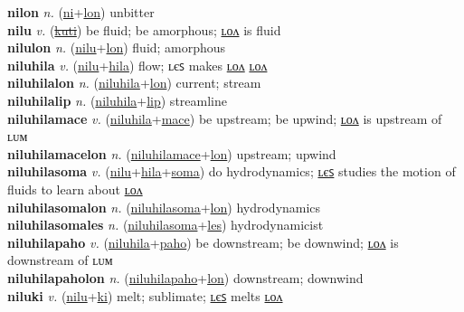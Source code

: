 \textbf{nilon} \textit{n.} (\hyperref[ni]{ni}+\hyperref[lon]{lon})
unbitter \label{nilon} \\
\textbf{nilu} \textit{v.} (\hyperref[kuti]{\sout{kuti}})
be fluid; be amorphous; \hyperref[nilulon]{ʟᴏᴧ} is fluid \label{nilu} \\
\textbf{nilulon} \textit{n.} (\hyperref[nilu]{nilu}+\hyperref[lon]{lon})
fluid; amorphous \label{nilulon} \\
\textbf{niluhila} \textit{v.} (\hyperref[nilu]{nilu}+\hyperref[hila]{hila})
flow; ʟєꜱ makes \hyperref[niluhilalon]{ʟᴏᴧ} \hyperref[niluhilalon]{ʟᴏᴧ} \label{niluhila} \\
\textbf{niluhilalon} \textit{n.} (\hyperref[niluhila]{niluhila}+\hyperref[lon]{lon})
current; stream \label{niluhilalon} \\
\textbf{niluhilalip} \textit{n.} (\hyperref[niluhila]{niluhila}+\hyperref[lip]{lip})
streamline \label{niluhilalip} \\
\textbf{niluhilamace} \textit{v.} (\hyperref[niluhila]{niluhila}+\hyperref[mace]{mace})
be upstream; be upwind; \hyperref[niluhilamacelon]{ʟᴏᴧ} is upstream of ʟᴜᴍ \label{niluhilamace} \\
\textbf{niluhilamacelon} \textit{n.} (\hyperref[niluhilamace]{niluhilamace}+\hyperref[lon]{lon})
upstream; upwind \label{niluhilamacelon} \\
\textbf{niluhilasoma} \textit{v.} (\hyperref[nilu]{nilu}+\hyperref[hila]{hila}+\hyperref[soma]{soma})
do hydrodynamics; \hyperref[niluhilasomales]{ʟєꜱ} studies the motion of fluids to learn about \hyperref[niluhilasomalon]{ʟᴏᴧ} \label{niluhilasoma} \\
\textbf{niluhilasomalon} \textit{n.} (\hyperref[niluhilasoma]{niluhilasoma}+\hyperref[lon]{lon})
hydrodynamics \label{niluhilasomalon} \\
\textbf{niluhilasomales} \textit{n.} (\hyperref[niluhilasoma]{niluhilasoma}+\hyperref[les]{les})
hydrodynamicist \label{niluhilasomales} \\
\textbf{niluhilapaho} \textit{v.} (\hyperref[niluhila]{niluhila}+\hyperref[paho]{paho})
be downstream; be downwind; \hyperref[niluhilapaholon]{ʟᴏᴧ} is downstream of ʟᴜᴍ \label{niluhilapaho} \\
\textbf{niluhilapaholon} \textit{n.} (\hyperref[niluhilapaho]{niluhilapaho}+\hyperref[lon]{lon})
downstream; downwind \label{niluhilapaholon} \\
\textbf{niluki} \textit{v.} (\hyperref[nilu]{nilu}+\hyperref[ki]{ki})
melt; sublimate; \hyperref[nilukiles]{ʟєꜱ} melts \hyperref[nilukilon]{ʟᴏᴧ} \label{niluki} \\
